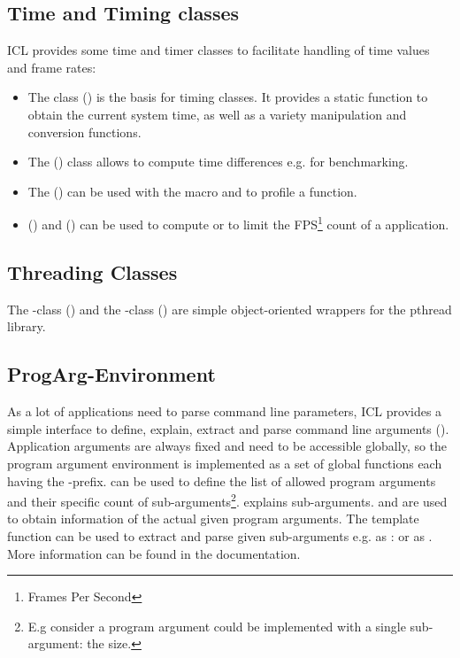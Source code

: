 \subsection{Time and Timing classes}
ICL provides some time and timer classes to facilitate handling of time values and frame rates:
\begin{itemize}
\item The  class () is the basis for timing classes. It provides a static function  to obtain the current system time, as well as a variety manipulation and conversion functions.
\item The  () class allows to compute time differences e.g. for benchmarking.
\item The  () can be used with the macro  and  to profile a function.
\item {} () and  () can be used to compute or to limit the FPS\footnote{Frames Per Second} count of a application.
\end{itemize}

\subsection{Threading Classes}
The -class () and the -class () are simple object-oriented wrappers for the pthread library.

\subsection{ProgArg-Environment} 
As a lot of applications need to parse command line parameters, ICL provides a simple interface to define, explain, extract and parse command line arguments (). Application arguments are always fixed and need to be accessible globally, so the program argument environment is  implemented as a set of global functions each having the -prefix.  can be used to define the list of allowed program arguments and their specific count of sub-arguments\footnote{E.g consider a program argument  could be implemented with a single sub-argument: the size.}.  explains sub-arguments.  and  are used to obtain information of the actual given program arguments.  The  template function can be used to extract and parse given sub-arguments e.g. as :
or as 
. More information can be found in the documentation.

